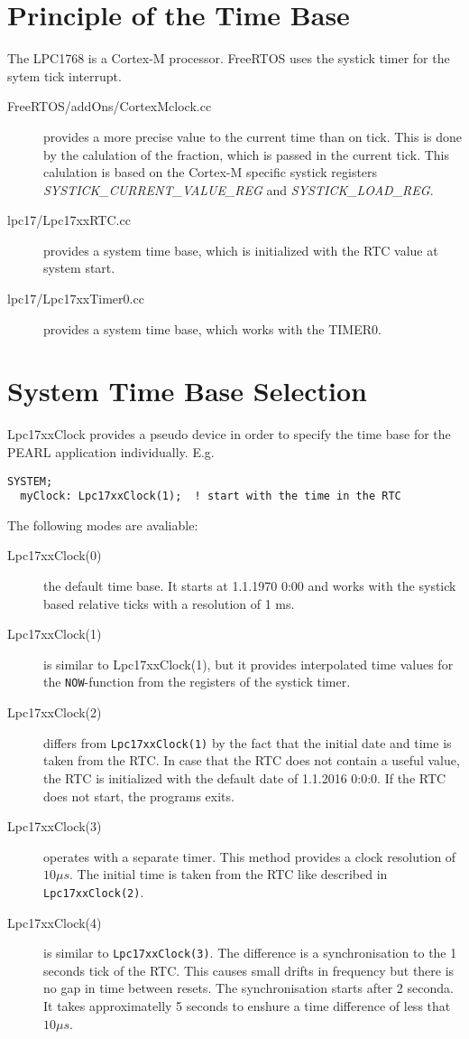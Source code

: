 \section{Principle of the Time Base}
The LPC1768 is a Cortex-M processor. FreeRTOS uses the systick timer 
for the sytem tick interrupt. 
\begin{description}
\item[FreeRTOS/addOns/CortexMclock.cc] provides a more precise value to
 the current time than on tick.
This is done
by the calulation of the fraction, which is passed in the current tick.
This calulation is based on the Cortex-M specific systick registers
{\em SYSTICK\_CURRENT\_VALUE\_REG} and {\em SYSTICK\_LOAD\_REG}.
\item[lpc17/Lpc17xxRTC.cc] provides a system time base, which is 
initialized with the RTC value at system start.
\item[lpc17/Lpc17xxTimer0.cc] provides a system time base, which works 
with the TIMER0.
\end{description}

\section{System Time Base Selection}
Lpc17xxClock provides a pseudo device in order
   to specify the time base for the PEARL application individually. E.g.

\begin{verbatim}
SYSTEM;
  myClock: Lpc17xxClock(1);  ! start with the time in the RTC
\end{verbatim}

The following modes are avaliable:
\begin{description}
\item[Lpc17xxClock(0)] the default time base. It starts at 1.1.1970 0:00
   and works with the systick based relative ticks with a resolution of 1 ms.
\item[Lpc17xxClock(1)] is similar to Lpc17xxClock(1), but it provides
   interpolated time values  for the \texttt{NOW}-function 
   from the registers of the systick timer.
\item[Lpc17xxClock(2)] differs from \texttt{Lpc17xxClock(1)} by the fact 
    that the initial date and time is taken from the RTC.
    In case that the RTC does not contain a useful value, the RTC
    is initialized with the default date of 1.1.2016 0:0:0.
    If the RTC does not start, the programs exits.
\item[Lpc17xxClock(3)] operates with a separate timer. This method
    provides a clock resolution of $10 \mu s$. The initial time is taken
    from the RTC like described in \texttt{Lpc17xxClock(2)}.
\item[Lpc17xxClock(4)] is similar to \texttt{Lpc17xxClock(3)}. 
    The difference is a synchronisation to the 1 seconds tick of the RTC.
    This causes small drifts in frequency but there is no gap in time 
    between resets. The synchronisation starts after 2 seconda.
    It takes approximatelly  5 seconds to enshure a time difference of
     less that $10\mu s$.
\end{description}

